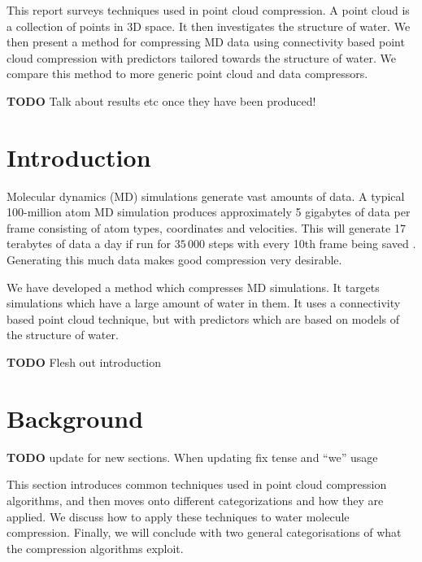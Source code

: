 \documentclass{report}
\newcommand{\todo}{\textbf{TODO} }
\begin{document}
This report surveys techniques used in point cloud compression. A point cloud
is a collection of points in 3D space. It then investigates the structure of
water. We then present a method for compressing MD data using connectivity
based point cloud compression with predictors tailored towards the structure
of water. We compare this method to more generic point cloud and data
compressors.

\todo Talk about results etc once they have been produced!

\tableofcontents

\chapter{Introduction}

Molecular dynamics (MD) simulations generate vast amounts of data. A typical
100-million atom MD simulation produces approximately 5 gigabytes of data per
frame consisting of atom types, coordinates and velocities. This will generate
17 terabytes of data a day if run for $35\,000$ steps with every 10th frame
being saved \citep{omeltchenko2000sls}. Generating this much data makes good
compression very desirable.

We have developed a method which compresses MD simulations. It targets
simulations which have a large amount of water in them. It uses a connectivity
based point cloud technique, but with predictors which are based on models of
the structure of water.

\todo Flesh out introduction

\chapter{Background}




\todo update for new sections. When updating fix tense and ``we'' usage

This section introduces common techniques used in point cloud compression
algorithms, and then moves onto different categorizations and how they are
applied. We discuss how to apply these techniques to water molecule
compression. Finally, we will conclude with two general categorisations of
what the compression algorithms exploit.
\end{document}
